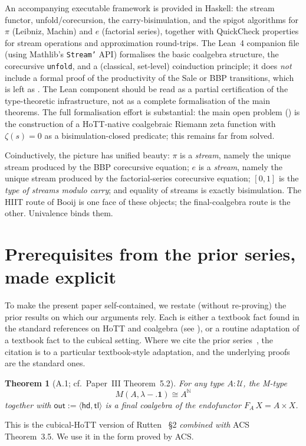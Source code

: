 \documentclass[12pt]{article}
\newtheorem{theorem}{Theorem}[section]
\theoremstyle{definition}
\theoremstyle{remark}
\newcommand{\Type}{\mathcal{U}}
\newcommand{\N}{\mathbb{N}}
\newcommand{\hd}{\mathsf{hd}}
\newcommand{\tl}{\mathsf{tl}}
\newcommand{\out}{\mathsf{out}}
\begin{document}
An accompanying executable framework is provided in Haskell:
the stream functor, unfold/corecursion, the carry-bisimulation,
and the spigot algorithms for $\pi$ (Leibniz, Machin) and $e$
(factorial series), together with QuickCheck properties for
stream operations and approximation round-trips. The Lean~4
companion file (using Mathlib's \texttt{Stream'} API) formalises
the basic coalgebra structure, the corecursive \texttt{unfold},
and a (classical, set-level) coinduction principle; it does
\emph{not} include a formal proof of the productivity of the
Sale or BBP transitions, which is left as
. The Lean component should be
read as a partial certification of the type-theoretic
infrastructure, not as a complete formalisation of the main
theorems. The full formalisation effort is substantial: the
main open problem () is the construction of a
HoTT-native coalgebraic Riemann zeta function with
$\zeta(s) = 0$ as a bisimulation-closed predicate; this remains
far from solved.

Coinductively, the picture has unified beauty:
$\pi$ is a \emph{stream}, namely the unique stream produced
by the BBP corecursive equation; $e$ is a \emph{stream},
namely the unique stream produced by the factorial-series
corecursive equation; $[0,1]$ is the \emph{type of streams modulo
carry}; and equality of streams is exactly bisimulation.
The HIIT route of Booij is one face of these objects; the
final-coalgebra route is the other. Univalence binds them.

\appendix
\section{Prerequisites from the prior series, made explicit}
\label{app:prereq}

To make the present paper self-contained, we restate (without
re-proving) the prior results on which our arguments rely. Each
is either a textbook fact found in the standard references on
HoTT and coalgebra
(see \cite{HoTTbook,booij,rutten,ACS,jacobs}), or a routine
adaptation of a textbook fact to the cubical setting. Where we
cite the prior series~\cite{paperIII,paperV,synthesis}, the
citation is to a particular textbook-style adaptation, and the
underlying proofs are the standard ones.

\begin{theorem}[A.1; cf.\ Paper~III Theorem~5.2]\label{thm:app-streams-final}
For any type $A : \Type$, the M-type
\[
  M(A,\lambda{-}.\mathbf{1}) \cong A^\N
\]
together with $\out := \langle\hd,\tl\rangle$ is a final coalgebra
of the endofunctor $F_A\,X = A \times X$.
\end{theorem}
This is the cubical-HoTT version of Rutten~\cite{rutten}
\S 2 \emph{combined with} ACS~\cite{ACS} Theorem~3.5. We use it
in the form proved by ACS.
\end{document}
